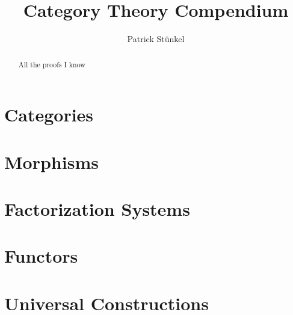 \documentclass{easychair}
\title{Category Theory Compendium}
\author{
	Patrick Stünkel\inst{1}%
}
\institute{
	Western Norway University of Applied Sciences,
	Bergen, Norway\\
	\email{past@hvl.no}
}
\begin{document}
\maketitle

\begin{abstract}
All the proofs I know
\end{abstract}




%
%

\section{Categories}
\label{sec:introduction}



\section{Morphisms}
\label{sec:morphisms}




\section{Factorization Systems}
\label{sec:factorizationSystems}


\section{Functors}
\label{sec:functors}








\section{Universal Constructions}
\label{sec:universalConstructions}
\end{document}
